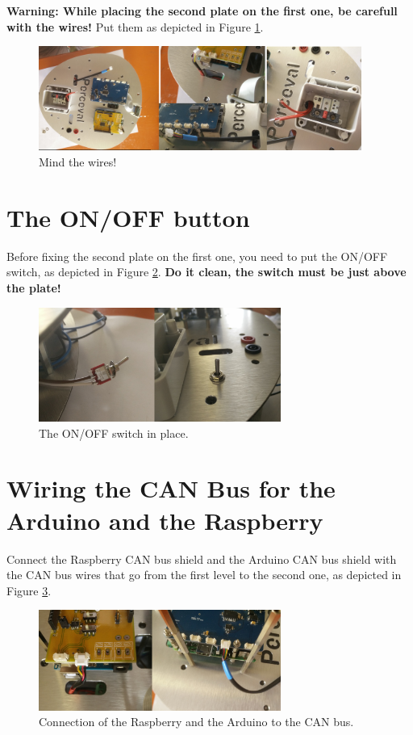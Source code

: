 \documentclass[10pt,a4paper]{report}   %
\begin{document}
\textbf{Warning: While placing the second plate on the first one, be carefull with the wires!} Put them as depicted in Figure \ref{fig:67}.

\begin{figure}[H]
\center
\includegraphics[width=400px]{images/67.jpg}
\caption{Mind the wires!}
\label{fig:67}
\end{figure}

\section{The ON/OFF button}

Before fixing the second plate on the first one, you need to put the ON/OFF switch, as depicted in Figure \ref{fig:68}. \textbf{Do it clean, the switch must be just above the plate!}

\begin{figure}[H]
\center
\includegraphics[width=300px]{images/68.jpg}
\caption{The ON/OFF switch in place.}
\label{fig:68}
\end{figure}

\section{Wiring the CAN Bus for the Arduino and the Raspberry}

Connect the Raspberry CAN bus shield and the Arduino CAN bus shield with the CAN bus wires that go from the first level to the second one, as depicted in Figure \ref{fig:69}.

\begin{figure}[H]
\center
\includegraphics[width=300px]{images/69.jpg}
\caption{Connection of the Raspberry and the Arduino to the CAN bus.}
\label{fig:69}
\end{figure}
\end{document}
